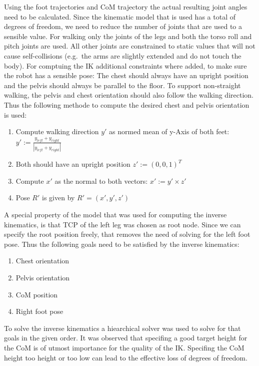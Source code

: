 \documentclass[english,ngerman]{KITreprt}
\newcommand{\fixme}[1]{{\color{red}{FIXME: #1}}}
\begin{document}
Using the foot trajectories and CoM trajectory the actual resulting
joint angles need to be calculated. Since the kinematic model that is
used has a total of \fixme{DOF} degrees of freedom, we need to reduce
the number of joints that are used to a sensible value. For walking only
the joints of the legs and both the torso roll and pitch joints are
used. All other joints are constrained to static values that will not
cause self-collisions (e.g.~the arms are slightly extended and do not
touch the body). For comptuing the IK additional constraints where
added, to make sure the robot has a sensible pose: The chest should
always have an upright position and the pelvis should always be parallel
to the floor. To support non-straight walking, the pelvis and chest
orientation should also follow the walking direction. Thus the following
methode to compute the desired chest and pelvis orientation is used:

\begin{enumerate}
\def\labelenumi{\arabic{enumi}.}
\item
  Compute walking direction $y'$ as normed mean of y-Axis of both feet:
  $y' := \frac{y_{left} + y_{right}}{|y_{left} + y_{right}|}$
\item
  Both should have an upright position $z' := (0, 0, 1)^T$
\item
  Compute $x'$ as the normal to both vectors: $x' := y' \times z'$
\item
  Pose $R'$ is given by $R' = (x', y', z')$
\end{enumerate}

A special property of the model that was used for computing the inverse
kinematics, is that TCP of the left leg was chosen as root node. Since
we can specify the root position freely, that removes the need of
solving for the left foot pose. Thus the following goals need to be
satisfied by the inverse kinematics:

\begin{enumerate}
\def\labelenumi{\arabic{enumi}.}
\item
  Chest orientation
\item
  Pelvis orientation
\item
  CoM position
\item
  Right foot pose
\end{enumerate}

To solve the inverse kinematics a hiearchical solver was used to solve
for that goals in the given order. It was observed that specifing a good
target height for the CoM is of utmost importance for the quality of the
IK. Specifing the CoM height too height or too low can lead to the
effective loss of degrees of freedom.
\end{document}
